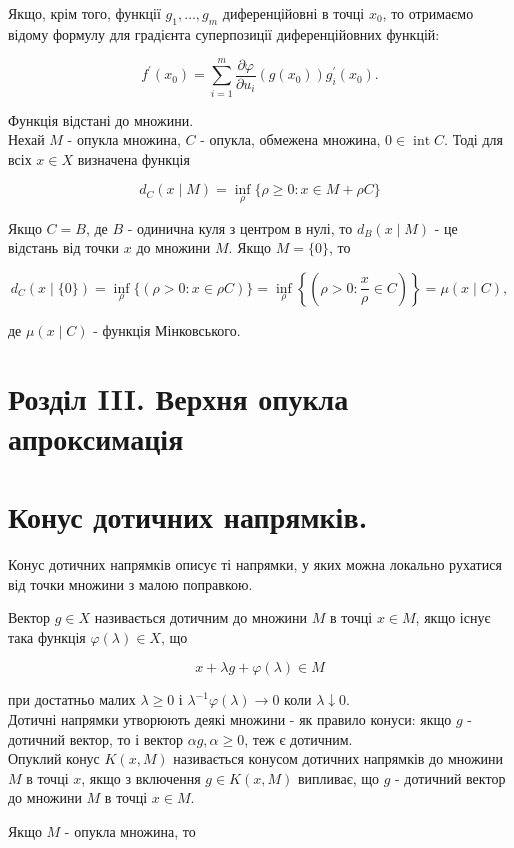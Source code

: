 \documentclass[10pt]{article}
\begin{document}
Якщо, крім того, функції $g_{1}, \ldots, g_{m}$ диференційовні в точці $x_{0}$, то отримаємо відому формулу для градієнта суперпозиції диференційовних функцій:

$$
f^{\prime}\left(x_{0}\right)=\sum_{i=1}^{m} \frac{\partial \varphi}{\partial u_{i}}\left(g\left(x_{0}\right)\right) g_{i}^{\prime}\left(x_{0}\right) .
$$

Функція відстані до множини.\\
Нехай $M$ - опукла множина, $C$ - опукла, обмежена множина, $0 \in \operatorname{int} C$. Тоді для всіх $x \in X$ визначена функція

$$
d_{C}(x \mid M)=\inf _{\rho}\{\rho \geq 0: x \in M+\rho C\}
$$

Якщо $C=B$, де $B$ - одинична куля з центром в нулі, то $d_{B}(x \mid M)$ - це відстань від точки $x$ до множини $M$. Якщо $M=\{0\}$, то

$$
d_{C}(x \mid\{0\})=\inf _{\rho}\{(\rho>0: x \in \rho C)\}=\inf _{\rho}\left\{\left(\rho>0: \frac{x}{\rho} \in C\right)\right\}=\mu(x \mid C),
$$

де $\mu(x \mid C)$ - функція Мінковського.

\section*{Розділ III. Верхня опукла апроксимація}
\section*{Конус дотичних напрямків.}
Конус дотичних напрямків описує ті напрямки, у яких можна локально рухатися від точки множини з малою поправкою.

Вектор $g \in X$ називається дотичним до множини $M$ в точці $x \in M$, якщо існує така функція $\varphi(\lambda) \in X$, що

$$
x+\lambda g+\varphi(\lambda) \in M
$$

при достатньо малих $\lambda \geq 0$ і $\lambda^{-1} \varphi(\lambda) \rightarrow 0$ коли $\lambda \downarrow 0$.\\
Дотичні напрямки утворюють деякі множини - як правило конуси: якщо $g$ - дотичний вектор, то і вектор $\alpha g, \alpha \geq 0$, теж є дотичним.\\
Опуклий конус $K(x, M)$ називається конусом дотичних напрямків до множини $M$ в точці $x$, якщо з включення $g \in K(x, M)$ випливає, що $g$ - дотичний вектор до множини $M$ в точці $x \in M$.

Якщо $M$ - опукла множина, то
\end{document}
